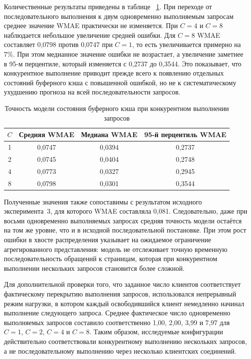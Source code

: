Количественные результаты приведены в таблице ~\ref{tab:buffer_concurrency_wmae}. При переходе от последовательного выполнения к двум одновременно выполняемым запросам среднее значение WMAE практически не изменяется. При $C=4$ и $C=8$ наблюдается небольшое увеличение средней ошибки. Для $C=8$ WMAE составляет 0{,}0798 против 0{,}0747 при $C=1$, то есть увеличивается примерно на 7\%. При этом медианное значение ошибки не возрастает, а увеличение заметнее в 95-м перцентиле, который изменяется с 0{,}2737 до 0{,}3544. Это показывает, что конкурентное выполнение приводит прежде всего к появлению отдельных состояний буферного кэша с повышенной ошибкой, но не к систематическому ухудшению прогноза на всей последовательности запросов.

\begin{table}[H]
    \centering
    \caption{Точность модели состояния буферного кэша при конкурентном выполнении запросов}
    \label{tab:buffer_concurrency_wmae}
    \begin{tabular}{|c|c|c|c|}
        \hline
        $C$ & Средняя WMAE & Медиана WMAE & 95-й перцентиль WMAE \\
        \hline
        1 & 0{,}0747 & 0{,}0394 & 0{,}2737 \\
        2 & 0{,}0745 & 0{,}0404 & 0{,}2748 \\
        4 & 0{,}0773 & 0{,}0327 & 0{,}2945 \\
        8 & 0{,}0798 & 0{,}0301 & 0{,}3544 \\
        \hline
    \end{tabular}
\end{table}

Полученные значения также сопоставимы с результатом исходного эксперимента~3, для которого WMAE составляла 0{,}081. Следовательно, даже при восьми одновременно выполняемых запросах средняя точность модели остаётся на том же уровне, что и в исходной последовательной постановке. При этом рост ошибки в хвосте распределения указывает на ожидаемое ограничение агрегированного представления: модель не отслеживает точную временную последовательность обращений к страницам, которая при конкурентном выполнении нескольких запросов становится более сложной.

Для дополнительной проверки того, что заданное число клиентов соответствует фактическому перекрытию выполнения запросов, использовался непрерывный режим нагрузки, в котором каждый освободившийся клиент немедленно начинал выполнение следующего запроса. Среднее фактическое число одновременно выполняемых запросов составило соответственно 1{,}00, 2{,}00, 3{,}99 и 7{,}97 для $C=1$, $C=2$, $C=4$ и $C=8$. Таким образом, исследуемые конфигурации действительно соответствовали конкурентному выполнению нескольких запросов, а не последовательному выполнению через несколько клиентских соединений.

